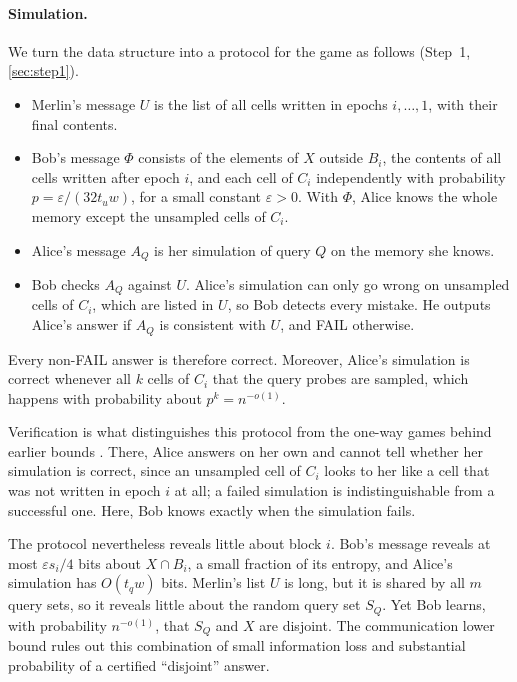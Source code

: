 \documentclass[11pt]{article}
\theoremstyle{plain}
\theoremstyle{definition}
\theoremstyle{remark}
\newcommand{\eps}{\varepsilon}
\begin{document}
\paragraph{Simulation.}
We turn the data structure into a protocol for the game as follows (Step~1, \cref{sec:step1}).
\begin{itemize}[leftmargin=*]
  \item Merlin's message $U$ is the list of all cells written in epochs $i, \dots, 1$, with their final contents.
  \item Bob's message $\Phi$ consists of the elements of $X$ outside $B_i$, the contents of all cells written after epoch $i$, and each cell of $C_i$ independently with probability $p = \eps/(32 t_u w)$, for a small constant $\eps > 0$. With $\Phi$, Alice knows the whole memory except the unsampled cells of $C_i$.
  \item Alice's message $A_Q$ is her simulation of query $Q$ on the memory she knows.
  \item Bob checks $A_Q$ against $U$. Alice's simulation can only go wrong on unsampled cells of $C_i$, which are listed in $U$, so Bob detects every mistake. He outputs Alice's answer if $A_Q$ is consistent with $U$, and FAIL otherwise.
\end{itemize}
Every non-FAIL answer is therefore correct. Moreover, Alice's simulation is correct whenever all $k$ cells of $C_i$ that the query probes are sampled, which happens with probability about $p^k = n^{-o(1)}$.

Verification is what distinguishes this protocol from the one-way games behind earlier bounds \cite{larsen_cell_2012,larsen_super-logarithmic_2025}. There, Alice answers on her own and cannot tell whether her simulation is correct, since an unsampled cell of $C_i$ looks to her like a cell that was not written in epoch $i$ at all; a failed simulation is indistinguishable from a successful one. Here, Bob knows exactly when the simulation fails.

The protocol nevertheless reveals little about block $i$. Bob's message reveals at most $\eps s_i/4$ bits about $X \cap B_i$, a small fraction of its entropy, and Alice's simulation has $O(t_q w)$ bits. Merlin's list $U$ is long, but it is shared by all $m$ query sets, so it reveals little about the random query set $S_Q$. Yet Bob learns, with probability $n^{-o(1)}$, that $S_Q$ and $X$ are disjoint. The communication lower bound rules out this combination of small information loss and substantial probability of a certified ``disjoint'' answer.
\end{document}
